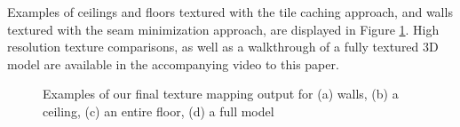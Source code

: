 \documentclass[10pt,twocolumn,letterpaper]{article}
\begin{document}
Examples of ceilings and floors textured with the tile caching approach, and walls
textured with the seam minimization approach, are displayed in Figure
\ref{fig:results}. High resolution texture comparisons, as well as a
walkthrough of a fully textured 3D model are available in the
accompanying video to this paper.



\begin{figure}
  \centering

  \centering

  \centering

  \centering
  \caption{Examples of our final texture mapping output for (a) walls, (b) a
    ceiling, (c) an entire floor, (d) a full model}
  \label{fig:results}
\end{figure}
\end{document}
